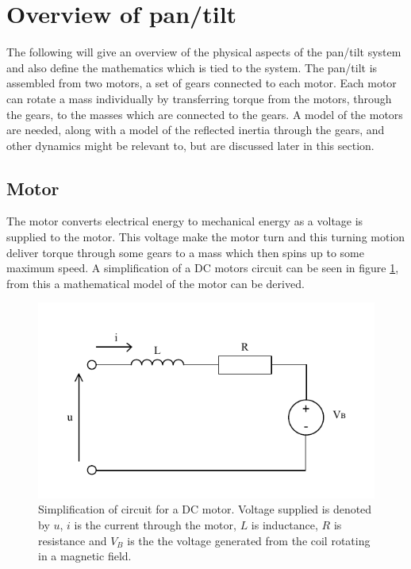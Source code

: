 \section{Overview of pan/tilt}
The following will give an overview of the physical aspects of the pan/tilt system and also define the mathematics which is tied to the system. The pan/tilt is assembled from two motors, a set of gears connected to each motor. Each motor can rotate a mass individually by transferring torque from the motors, through the gears, to the masses which are connected to the gears. A model of the motors are needed, along with a model of the reflected inertia through the gears, and other dynamics might be relevant to, but are discussed later in this section.

\subsection{Motor}
The motor converts electrical energy to mechanical energy as a voltage is supplied to the motor. This voltage make the motor turn and this turning motion deliver torque through some gears to a mass which then spins up to some maximum speed. A simplification of a DC motors circuit can be seen in figure \ref{fig:motor_circuit}, from this a mathematical model of the motor can be derived.
\begin{figure}[htb]
	\centering
	\includegraphics[scale=1,clip,trim=0 10 0 10]{graphics/motor_circuit.pdf} %
	\caption{Simplification of circuit for a DC motor. Voltage supplied is denoted by $u$, $i$ is the current through the motor, $L$ is inductance, $R$ is resistance and $V_B$ is the the voltage generated from the coil rotating in a magnetic field.}
	\label{fig:motor_circuit}			%
\end{figure}
